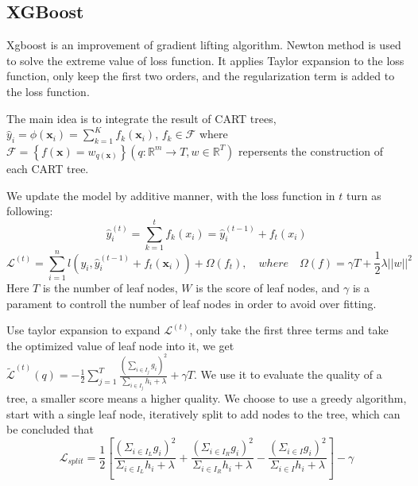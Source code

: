 \documentclass{article}
\begin{document}
\subsection{XGBoost}

Xgboost is an improvement of gradient lifting algorithm. Newton method is used to solve the extreme value of loss function. It applies Taylor expansion to the loss function, only keep the first two orders, and the regularization term is added to the loss function.


The main idea is to  integrate the result of CART trees, $\hat{y}_{i}=\phi\left(\mathbf{x}_{i}\right)=\sum_{k=1}^{K} f_{k}\left(\mathbf{x}_{i}\right)$, $f_{k} \in \mathcal{F}$ where  $\mathcal{F}=\left\{f(\mathbf{x})=w_{q(\mathbf{x})}\right\}\left(q: \mathbb{R}^{m} \rightarrow T, w \in \mathbb{R}^{T}\right)$ repersents the construction of each CART tree. 


We update the model by additive manner, with the loss function in $t$ turn as following: $$\hat{y}_{i}^{(t)}=\sum_{k=1}^{t} f_{k}\left(x_{i}\right)=\hat{y}_{i}^{(t-1)}+f_{t}\left(x_{i}\right)$$ $$\mathcal{L}^{(t)}=\sum_{i=1}^{n} l\left(y_{i}, \hat{y}_{i}^{(t-1)}+f_{t}\left(\mathbf{x}_{i}\right)\right)+\Omega\left(f_{t}\right), \quad where \quad  \Omega(f) = \gamma T + \frac{1}{2}\lambda \left|\left|w\right|\right| ^2$$ Here $T$ is the number of leaf nodes, $W$ is the score of leaf nodes, and $\gamma$ is a parament to controll the number of leaf nodes in order to  avoid over fitting.  


Use taylor expansion to expand $\mathcal{L}^{(t)}$, only take the first three terms and take the optimized value of leaf node into it, we get $\tilde{\mathcal{L}}^{(t)}(q)=-\frac{1}{2} \sum_{j=1}^{T} \frac{\left(\sum_{i \in I_{j}} g_{i}\right)^{2}}{\sum_{i \in I_{j}} h_{i}+\lambda}+\gamma T$. We use it to evaluate the quality of a tree, a smaller score means a higher quality. We choose to use a greedy algorithm, start with a single leaf node, iteratively split to add nodes to the tree, which can be concluded that $$\mathcal{L}_{split} = \frac{1}{2} \left[ \frac{\left( \Sigma_{i \in I_{L}} g_i\right) ^2}{\Sigma_{i \in I_{L}} h_i+\lambda} + \frac{\left( \Sigma_{i \in I_{R}} g_i\right) ^2}{\Sigma_{i \in I_{R}} h_i+\lambda} - \frac{\left( \Sigma_{i \in I} g_i\right) ^2}{\Sigma_{i \in I} h_i+\lambda} \right] - \gamma  $$
\end{document}
